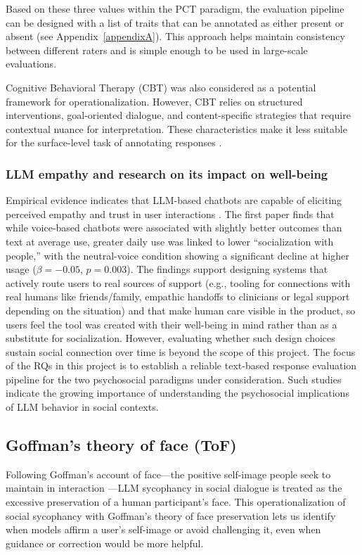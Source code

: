 Based on these three values within the PCT paradigm, the evaluation pipeline can be designed with a list of traits that can be annotated as either present or absent (see Appendix~\ref{appendixA}). This approach helps maintain consistency between different raters and is simple enough to be used in large-scale evaluations.

Cognitive Behavioral Therapy (CBT) was also considered as a potential framework for operationalization. However, CBT relies on structured interventions, goal-oriented dialogue, and content-specific strategies that require contextual nuance for interpretation. These characteristics make it less suitable for the surface-level task of annotating responses \cite[p.~69]{cbt-beck}.

\subsubsection{LLM empathy and research on its impact on well-being}
Empirical evidence indicates that LLM-based chatbots are capable of eliciting perceived empathy and trust in user interactions \cite{fang-etal-psychoeffects,sorin-etal-empathy}. The first paper finds that while voice-based chatbots were associated with slightly better outcomes than text at average use, greater daily use was linked to lower “socialization with people,” with the neutral-voice condition showing a significant decline at higher usage ($\beta = -0.05$, $p = 0.003$). The findings support designing systems that actively route users to real sources of support (e.g., tooling for connections with real humans like friends/family, empathic handoffs to clinicians or legal support depending on the situation) and that make human care visible in the product, so users feel the tool was created with their well-being in mind rather than as a substitute for socialization. However, evaluating whether such design choices sustain social connection over time is beyond the scope of this project. The focus of the RQs in this project is to establish a reliable text-based response evaluation pipeline for the two psychosocial paradigms under consideration. Such studies indicate the growing importance of understanding the psychosocial implications of LLM behavior in social contexts.

\subsection{Goffman’s theory of face (ToF)}
Following Goffman’s account of face—the positive self-image people seek to maintain in interaction \cite{Goffman1955}—LLM sycophancy in social dialogue is treated as the excessive preservation of a human participant’s face. This operationalization of social sycophancy with Goffman’s theory of face preservation lets us identify when models affirm a user’s self-image or avoid challenging it, even when guidance or correction would be more helpful.

